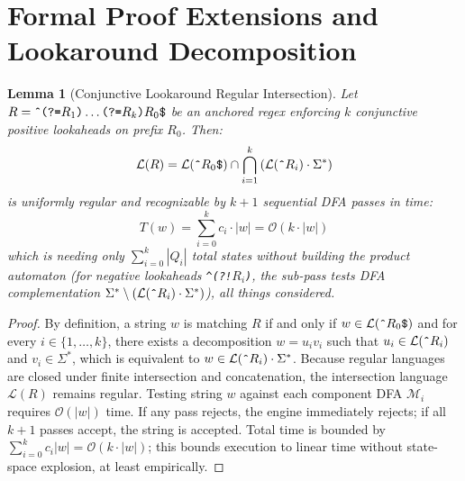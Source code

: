 \documentclass{ieeeaccess}
\newtheorem{lemma}{Lemma}
\begin{document}
\appendices

\section{Formal Proof Extensions and Lookaround Decomposition}

\begin{lemma}[Conjunctive Lookaround Regular Intersection]\label{lem:lookaround_decomp}
Let $R = \text{\texttt{\^{}}}\text{\texttt{(?=}}R_1\text{\texttt{)}}\dots\text{\texttt{(?=}}R_k\text{\texttt{)}}R_0\text{\texttt{\$}}$ be an anchored regex enforcing $k$ conjunctive positive lookaheads on prefix $R_0$. Then:
\begin{equation}\label{eq:lemma1_decomp}
\mathcal{L}(R) = \mathcal{L}(\text{\texttt{\^{}}}R_0\text{\texttt{\$}}) \cap \bigcap_{i=1}^k \left( \mathcal{L}(\text{\texttt{\^{}}}R_i) \cdot \Sigma^* \right)
\end{equation}
is uniformly regular and recognizable by $k+1$ sequential DFA passes in time:
\begin{equation}\label{eq:lemma1_time}
T(w) = \sum_{i=0}^k c_i \cdot |w| = \mathcal{O}(k \cdot |w|)
\end{equation}
which is needing only $\sum_{i=0}^k |Q_i|$ total states without building the product automaton (for negative lookaheads \texttt{\^{}(?!$R_i$)}, the sub-pass tests DFA complementation $\Sigma^* \setminus (\mathcal{L}(\text{\texttt{\^{}}}R_i) \cdot \Sigma^*)$), all things considered.
\end{lemma}

\begin{proof}
By definition, a string $w$ is matching $R$ if and only if $w \in \mathcal{L}(\text{\texttt{\^{}}}R_0\text{\texttt{\$}})$ and for every $i \in \{1, \dots, k\}$, there exists a decomposition $w = u_i v_i$ such that $u_i \in \mathcal{L}(\text{\texttt{\^{}}}R_i)$ and $v_i \in \Sigma^*$, which is equivalent to $w \in \mathcal{L}(\text{\texttt{\^{}}}R_i) \cdot \Sigma^*$. Because regular languages are closed under finite intersection and concatenation, the intersection language $\mathcal{L}(R)$ remains regular. Testing string $w$ against each component DFA $\mathcal{M}_i$ requires $\mathcal{O}(|w|)$ time. If any pass rejects, the engine immediately rejects; if all $k+1$ passes accept, the string is accepted. Total time is bounded by $\sum_{i=0}^k c_i |w| = \mathcal{O}(k \cdot |w|)$; this bounds execution to linear time without state-space explosion, at least empirically.
\end{proof}
\end{document}
